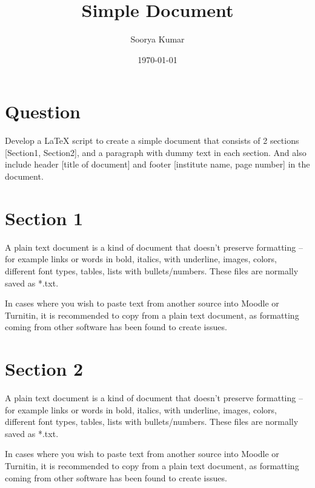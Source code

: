 \documentclass[12pt,a4paper]{article}
\title{\LARGE \textbf{Simple Document}}
\author{Soorya Kumar}
\date{\today}
\begin{document}
	\maketitle
	\thispagestyle{fancy}
	
	\section*{Question}
		{\large Develop a LaTeX script to create a simple document that consists of 2 sections [Section1, Section2], and a
			paragraph with dummy text in each section. And also include header [title of document] and footer
			[institute name, page number] in the document.}
			
	\section{Section 1}
		A plain text document is a kind of document that doesn’t preserve formatting – for example links or words in bold, italics, with underline, images, colors, different font types, tables, lists with bullets/numbers. These files are normally saved as *.txt.
		
		In cases where you wish to paste text from another source into Moodle or Turnitin, it is recommended to copy from a plain text document, as formatting coming from other software has been found to create issues.
	
	\section{Section 2}
		A plain text document is a kind of document that doesn’t preserve formatting – for example links or words in bold, italics, with underline, images, colors, different font types, tables, lists with bullets/numbers. These files are normally saved as *.txt.
		
		In cases where you wish to paste text from another source into Moodle or Turnitin, it is recommended to copy from a plain text document, as formatting coming from other software has been found to create issues.
	
	
\end{document}
